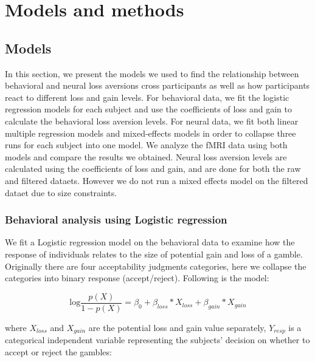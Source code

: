 \documentclass[11pt]{article}
\begin{document}
\section{Models and methods}

\subsection{Models}

In this section, we present the models we used to find the relationship between behavioral and neural loss aversions cross participants as well as how participants react to different loss and gain levels. For behavioral data, we fit the logistic regression models for each subject and use the coefficients of loss and gain to calculate the behavioral loss aversion levels. For neural data, we fit both linear multiple regression models and mixed-effects models in order to collapse three runs for each subject into one model. We analyze the fMRI data using both models and compare the results we obtained. Neural loss aversion levels are calculated using the coefficients of loss and gain, and are done for both the raw and filtered dataets. However we do not run a mixed effects model on the filtered dataet due to size constraints.   

\subsubsection{Behavioral analysis using Logistic regression}

We fit a Logistic regression model on the behavioral data to examine how the response of individuals relates to the size of potential gain and loss of a gamble. Originally there are four acceptability judgments categories, here we collapse the categories into binary response (accept/reject). Following is the model:

\begin{equation}
\textrm{log}\frac{p(X)}{1-p(X)} = \beta_0 + \beta_{loss} *X_{loss} + \beta_{gain} * X_{gain}
\end{equation}

where $X_{loss}$ and $X_{gain}$ are the potential loss and gain value separately, $Y_{resp}$ is a categorical independent variable representing the subjects' decision on whether to accept or reject the gambles:
\end{document}
